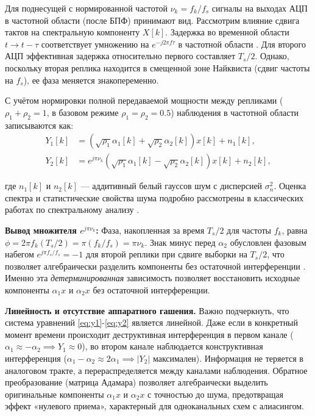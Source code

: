 \documentclass[a4paper,12pt]{article}
\numberwithin{equation}{section}
\begin{document}
Для поднесущей с нормированной частотой $\nu_k = f_k / f_s$ сигналы на выходах АЦП в частотной области (после БПФ) принимают вид. Рассмотрим влияние сдвига тактов на спектральную компоненту $X[k]$. Задержка во временной области $t \to t - \tau$ соответствует умножению на $e^{-j 2 \pi f \tau}$ в частотной области \cite{oppenheim}. Для второго АЦП эффективная задержка относительно первого составляет $T_s/2$. Однако, поскольку вторая реплика находится в смещенной зоне Найквиста (сдвиг частоты на $f_s$), ее фаза меняется знакопеременно.

С учётом нормировки полной передаваемой мощности между репликами ($\rho_1 + \rho_2 = 1$, в базовом режиме $\rho_1 = \rho_2 = 0.5$) наблюдения в частотной области записываются как:
\begin{align}
Y_1[k] &= \left( \sqrt{\rho_1}\alpha_1[k] + \sqrt{\rho_2}\alpha_2[k] \right) x[k] + n_1[k], \label{eq:y1} \\
Y_2[k] &= e^{j \pi \nu_k} \left( \sqrt{\rho_1}\alpha_1[k] - \sqrt{\rho_2}\alpha_2[k] \right) x[k] + n_2[k], \label{eq:y2}
\end{align}

где $n_1[k]$ и $n_2[k]$ — аддитивный белый гауссов шум с дисперсией $\sigma_n^2$. Оценка спектра и статистические свойства шума подробно рассмотрены в классических работах по спектральному анализу \cite{black}.

\textbf{Вывод множителя $e^{j \pi \nu_k}$:}
Фаза, накопленная за время $T_s/2$ для частоты $f_k$, равна $\phi = 2 \pi f_k (T_s/2) = \pi (f_k/f_s) = \pi \nu_k$. Знак минус перед $\alpha_2$ обусловлен фазовым набегом $e^{j \pi f_s / f_s} = -1$ для второй реплики при сдвиге выборки на $T_s/2$, что позволяет алгебраически разделить компоненты без остаточной интерференции \cite{vaughan}. Именно эта \textit{детерминированная} зависимость позволяет восстановить исходные компоненты $\alpha_1 x$ и $\alpha_2 x$ без остаточной интерференции.

\textbf{Линейность и отсутствие аппаратного гашения.} Важно подчеркнуть, что система уравнений \eqref{eq:y1}-\eqref{eq:y2} является линейной. Даже если в конкретный момент времени происходит деструктивная интерференция в первом канале ($\alpha_1 \approx -\alpha_2 \implies Y_1 \approx 0$), во втором канале наблюдается конструктивная интерференция ($\alpha_1 - \alpha_2 \approx 2\alpha_1 \implies |Y_2|$ максимален). Информация не теряется в аналоговом тракте, а перераспределяется между каналами наблюдения. Обратное преобразование (матрица Адамара) позволяет алгебраически выделить оригинальные компоненты $\alpha_1 x$ и $\alpha_2 x$ с точностью до шума, предотвращая эффект «нулевого приема», характерный для одноканальных схем с алиасингом.
\end{document}

